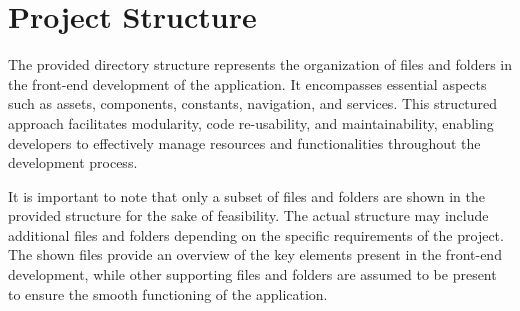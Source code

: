 




\section{Project Structure}

The provided directory structure represents the organization of files and folders in the front-end development of the application. It encompasses essential aspects such as assets, components, constants, navigation, and services. This structured approach facilitates modularity, code re-usability, and maintainability, enabling developers to effectively manage resources and functionalities throughout the development process.

It is important to note that only a subset of files and folders are shown in the provided structure for the sake of feasibility. The actual structure may include additional files and folders depending on the specific requirements of the project. The shown files provide an overview of the key elements present in the front-end development, while other supporting files and folders are assumed to be present to ensure the smooth functioning of the application.



